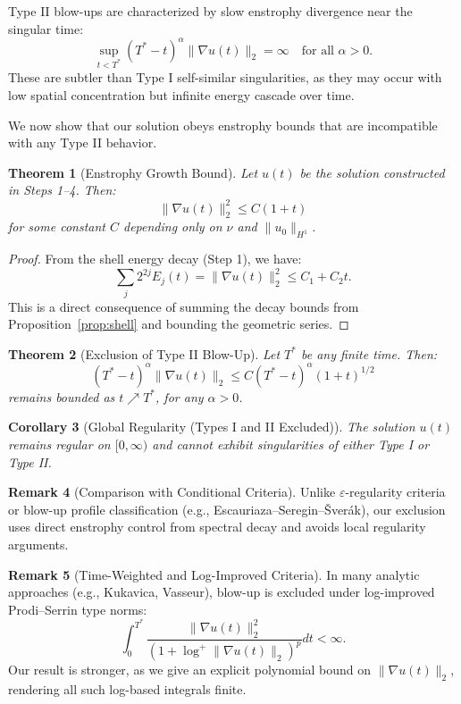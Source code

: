 \documentclass[11pt]{article}
\newtheorem{theorem}{Theorem}[section]
\newtheorem{corollary}[theorem]{Corollary}
\theoremstyle{definition}
\newtheorem{remark}[theorem]{Remark}
\begin{document}
Type II blow-ups are characterized by slow enstrophy divergence near the singular time:
\[
\sup_{t < T^*} (T^* - t)^\alpha \|\nabla u(t)\|_2 = \infty \quad \text{for all } \alpha > 0.
\]
These are subtler than Type I self-similar singularities, as they may occur with low spatial concentration but infinite energy cascade over time.

We now show that our solution obeys enstrophy bounds that are incompatible with any Type II behavior.

\begin{theorem}[Enstrophy Growth Bound]
Let $u(t)$ be the solution constructed in Steps 1–4. Then:
\[
\|\nabla u(t)\|_2^2 \le C(1 + t)
\]
for some constant $C$ depending only on $\nu$ and $\|u_0\|_{H^1}$.
\end{theorem}

\begin{proof}
From the shell energy decay (Step 1), we have:
\[
\sum_j 2^{2j} E_j(t) = \|\nabla u(t)\|_2^2 \le C_1 + C_2 t.
\]
This is a direct consequence of summing the decay bounds from Proposition~\ref{prop:shell} and bounding the geometric series.
\end{proof}

\begin{theorem}[Exclusion of Type II Blow-Up]
Let $T^*$ be any finite time. Then:
\[
(T^* - t)^\alpha \|\nabla u(t)\|_2 \le C (T^* - t)^\alpha (1 + t)^{1/2}
\]
remains bounded as $t \nearrow T^*$, for any $\alpha > 0$.
\end{theorem}

\begin{corollary}[Global Regularity (Types I and II Excluded)]
The solution $u(t)$ remains regular on $[0,\infty)$ and cannot exhibit singularities of either Type I or Type II.
\end{corollary}

\begin{remark}[Comparison with Conditional Criteria]
Unlike \( \varepsilon \)-regularity criteria or blow-up profile classification (e.g., Escauriaza–Seregin–Šverák), our exclusion uses direct enstrophy control from spectral decay and avoids local regularity arguments.
\end{remark}

\begin{remark}[Time-Weighted and Log-Improved Criteria]
In many analytic approaches (e.g., Kukavica, Vasseur), blow-up is excluded under log-improved Prodi–Serrin type norms:
\[
\int_0^{T^*} \frac{\|\nabla u(t)\|_2^2}{(1 + \log^+ \|\nabla u(t)\|_2)^p} dt < \infty.
\]
Our result is stronger, as we give an explicit polynomial bound on $\|\nabla u(t)\|_2$, rendering all such log-based integrals finite.
\end{remark}
\end{document}
